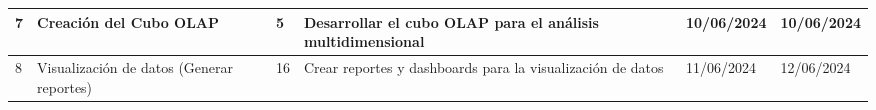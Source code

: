 \begin{longtable}{|p{0.5cm}|p{2cm}|p{1cm}|p{3cm}|p{1cm}|p{1cm}|}
    7                                        & Creación del Cubo OLAP                               & 5                                                              & Desarrollar el cubo OLAP para el análisis multidimensional                      & 10/06/2024                                                    & 10/06/2024                                                          \\ \hline
    8                                        & Visualización de datos (Generar reportes)            & 16                                                             & Crear reportes y dashboards para la visualización de datos                      & 11/06/2024                                                    & 12/06/2024                                                          \\ \hline
\end{longtable}